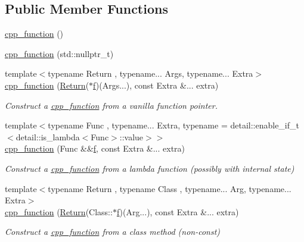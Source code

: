 \subsection*{Public Member Functions}
\begin{DoxyCompactItemize}
\item 
\mbox{\hyperlink{classcpp__function_ae280a9823b07b3832e8d7e786a863bf4}{cpp\+\_\+function}} ()
\item 
\mbox{\hyperlink{classcpp__function_a645776419d4d24d2fef4c3339cffe7c3}{cpp\+\_\+function}} (std\+::nullptr\+\_\+t)
\item 
{\footnotesize template$<$typename Return , typename... Args, typename... Extra$>$ }\\\mbox{\hyperlink{classcpp__function_adf288fd4fadeaf8e9e142d177fc267da}{cpp\+\_\+function}} (\mbox{\hyperlink{_python-ast_8h_abdae7f49d66ce8e500825bb53aa14901}{Return}}($\ast$\mbox{\hyperlink{_s_d_l__opengl__glext_8h_a691492ec0bd6383f91200e49f6ae40ed}{f}})(Args...), const Extra \&... extra)
\begin{DoxyCompactList}\small\item\em Construct a \mbox{\hyperlink{classcpp__function}{cpp\+\_\+function}} from a vanilla function pointer. \end{DoxyCompactList}\item 
{\footnotesize template$<$typename Func , typename... Extra, typename  = detail\+::enable\+\_\+if\+\_\+t$<$detail\+::is\+\_\+lambda$<$\+Func$>$\+::value$>$$>$ }\\\mbox{\hyperlink{classcpp__function_a345da213151996cb60ba487622036899}{cpp\+\_\+function}} (Func \&\&\mbox{\hyperlink{_s_d_l__opengl__glext_8h_a691492ec0bd6383f91200e49f6ae40ed}{f}}, const Extra \&... extra)
\begin{DoxyCompactList}\small\item\em Construct a \mbox{\hyperlink{classcpp__function}{cpp\+\_\+function}} from a lambda function (possibly with internal state) \end{DoxyCompactList}\item 
{\footnotesize template$<$typename Return , typename Class , typename... Arg, typename... Extra$>$ }\\\mbox{\hyperlink{classcpp__function_a977ae047c5ece21dbfbbccda8c304986}{cpp\+\_\+function}} (\mbox{\hyperlink{_python-ast_8h_abdae7f49d66ce8e500825bb53aa14901}{Return}}(Class\+::$\ast$\mbox{\hyperlink{_s_d_l__opengl__glext_8h_a691492ec0bd6383f91200e49f6ae40ed}{f}})(Arg...), const Extra \&... extra)
\begin{DoxyCompactList}\small\item\em Construct a \mbox{\hyperlink{classcpp__function}{cpp\+\_\+function}} from a class method (non-\/const) \end{DoxyCompactList}\item 

\end{DoxyCompactItemize}
